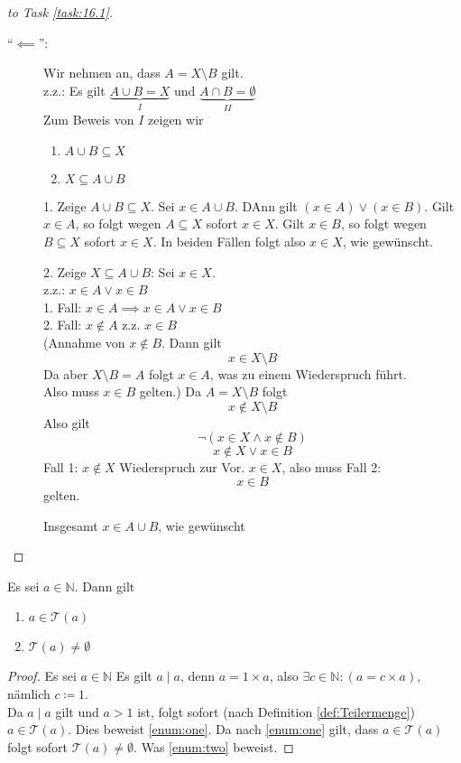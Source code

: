 \documentclass[a4paper, parskip = true, fleqn, headsepline = true]{scrartcl}
\newcommand{\N}{\mathbb{N}}
\begin{document}
\begin{proof}[to Task \ref{task:16.1}]
\begin{description}
		\item[``$ \impliedby $'':]
			Wir nehmen an, dass $ A = X \setminus B $ gilt.\\
			z.z.: Es gilt $ \underbrace{ A \cup B = X }_{ I } $ und $ \underbrace{ A \cap B = \emptyset }_{ II } $\\
			Zum Beweis von $ I $ zeigen wir
			\begin{enumerate}
				\item \label{enum:ACupBSubseteqX} $ A \cup B \subseteq X $
				\item \label{enum:XSubseteqACupB} $ X \subseteq A \cup B $
			\end{enumerate}
			1. Zeige $ A \cup B \subseteq X $. Sei $ x \in A \cup B $. DAnn gilt $ ( x \in A ) \vee ( x \in B ) $. Gilt $ x \in A $, so folgt wegen $ A \subseteq X $ sofort $ x \in X $. Gilt $ x \in B $, so folgt wegen $ B \subseteq X $ sofort $ x \in X $. In beiden Fällen folgt also $ x \in X $, wie gewünscht.\par
			2. Zeige $ X \subseteq A \cup B $: Sei $ x \in X $.\\
			z.z.: $ x \in A \vee x \in B $\\
			1. Fall: $ x \in A \implies x \in A \vee x \in B $\\
			2. Fall: $ x \notin A $ z.z. $ x \in B $\\
			(Annahme von $ x \notin B $. Dann gilt
			\[ x \in X \setminus B \]
			Da aber $ X \setminus B = A $ folgt $ x \in A $, was zu einem Wiederspruch führt.\\
			Also muss $x  \in B $ gelten.)
			Da $ A = X \setminus B $ folgt
			\[ x \notin X \setminus B \]
			Also gilt
			\[ \neg ( x \in X \wedge x \notin B ) \]
			\[ x \notin X \vee x \in B \]
			Fall 1: $ x \notin X $ Wiederspruch zur Vor. $ x \in X $, also muss
			Fall 2: 
			\[x \in B \]
			gelten.\par
			Insgesamt $ x \in A \cup B $, wie gewünscht
	\end{description}
\end{proof}

\begin{lemma}
	Es sei $ a \in \mathbb{N} $. Dann gilt
	\begin{enumerate}[label=(\roman*)]
		\item $ a \in \mathcal{T}(a) $ \label{enum:one}
		\item $ \mathcal{T}(a) \neq \emptyset $ \label{enum:two}
	\end{enumerate}
	\begin{proof}
		Es sei $ a \in \N $ Es gilt $ a \mid a $, denn $ a = 1 \times a $, also $ \exists c \in \N : (a = c \times a ) $, nämlich $ c \coloneqq 1 $.\\
		Da $ a \mid a $ gilt und $ a > 1 $ ist, folgt sofort (nach Definition \ref{def:Teilermenge}) $ a \in \mathcal{T}(a) $. Dies beweist \ref{enum:one}.
		Da nach \ref{enum:one} gilt, dass $ a \in \mathcal{T}(a) $ folgt sofort $ \mathcal{T}(a) \neq \emptyset $. Was \ref{enum:two} beweist.
	\end{proof}
\end{lemma}
\end{document}
